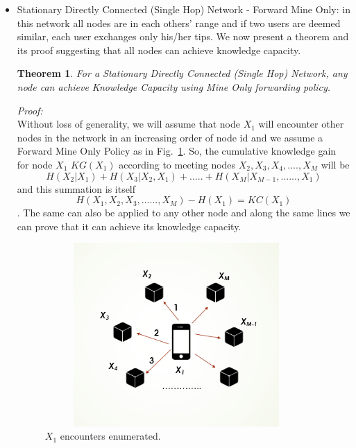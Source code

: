 \documentclass[11pt]{article}
\newtheorem{theorem}{Theorem}
\begin{document}
\begin{itemize}
\item{Stationary Directly Connected (Single Hop) Network - Forward Mine Only:}
in this network all nodes are in each others' range and if two users are deemed similar, each user exchanges only his/her tips.
We now present a theorem and its proof suggesting that all nodes can achieve knowledge capacity.

\begin{theorem}
For a Stationary Directly Connected (Single Hop) Network, any node can achieve Knowledge Capacity using Mine Only forwarding policy.\\

\end{theorem}

\textit{Proof:}\\
Without loss of generality, we will assume that node $X_1$ will encounter other nodes in the network in an increasing order of node id and we assume a Forward Mine Only Policy as in Fig.~\ref{SSHPNet}. So, the cumulative knowledge gain for node $X_1$ $KG(X_1)$ according to meeting nodes $X_2, X_3, X_4,...., X_M$ will be $$H(X_2|X_1) + H(X_3|X_2,X_1) + .....+ H(X_M|X_{M-1}, ......, X_1)$$ and this summation is itself $$H(X_1, X_2, X_3, ......, X_M) - H(X_1)= KC(X_1)$$. The same can also be applied to any other node and along the same lines we can prove that it can achieve its knowledge capacity.\\
\begin{figure}[!tp]
\centering
    \includegraphics[width=10cm ,height=7cm]{figures_png/SSHPNet}
    \caption{$X_1$ encounters enumerated.}\label{fig:KGEncounter}
    \label{SSHPNet}
\end{figure}


\end{itemize}
\end{document}

